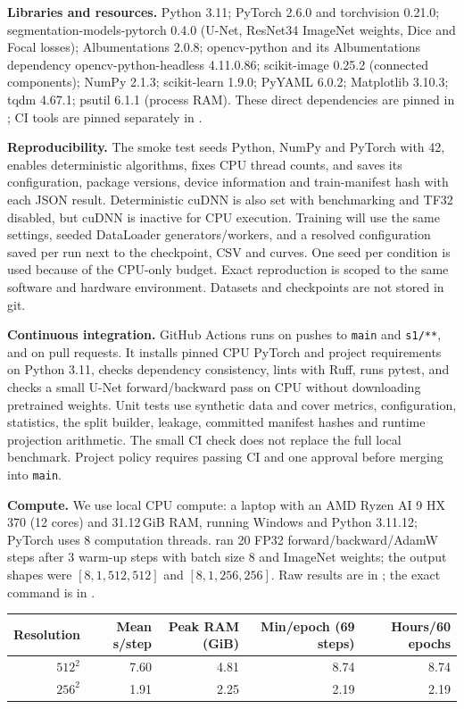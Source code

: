 \documentclass[11pt,a4paper]{article}
\begin{document}
\textbf{Libraries and resources.} Python 3.11; PyTorch 2.6.0 and torchvision 0.21.0; segmentation-models-pytorch 0.4.0 (U-Net, ResNet34 ImageNet weights, Dice and Focal losses); Albumentations 2.0.8; opencv-python and its Albumentations dependency opencv-python-headless 4.11.0.86; scikit-image 0.25.2 (connected components); NumPy 2.1.3; scikit-learn 1.9.0; PyYAML 6.0.2; Matplotlib 3.10.3; tqdm 4.67.1; psutil 6.1.1 (process RAM). These direct dependencies are pinned in ; CI tools are pinned separately in .

\textbf{Reproducibility.} The smoke test seeds Python, NumPy and PyTorch with 42, enables deterministic algorithms, fixes CPU thread counts, and saves its configuration, package versions, device information and train-manifest hash with each JSON result. Deterministic cuDNN is also set with benchmarking and TF32 disabled, but cuDNN is inactive for CPU execution. Training will use the same settings, seeded DataLoader generators/workers, and a resolved configuration saved per run next to the checkpoint, CSV and curves. One seed per condition is used because of the CPU-only budget. Exact reproduction is scoped to the same software and hardware environment. Datasets and checkpoints are not stored in git.

\textbf{Continuous integration.} GitHub Actions runs on pushes to \texttt{main} and \texttt{s1/**}, and on pull requests. It installs pinned CPU PyTorch and project requirements on Python 3.11, checks dependency consistency, lints with Ruff, runs pytest, and checks a small U-Net forward/backward pass on CPU without downloading pretrained weights. Unit tests use synthetic data and cover metrics, configuration, statistics, the split builder, leakage, committed manifest hashes and runtime projection arithmetic. The small CI check does not replace the full local benchmark. Project policy requires passing CI and one approval before merging into \texttt{main}.

\textbf{Compute.} We use local CPU compute: a laptop with an AMD Ryzen AI 9 HX 370 (12 cores) and 31.12\,GiB RAM, running Windows and Python 3.11.12; PyTorch uses 8 computation threads.  ran 20 FP32 forward/backward/AdamW steps after 3 warm-up steps with batch size 8 and ImageNet weights; the output shapes were $[8,1,512,512]$ and $[8,1,256,256]$. Raw results are in ; the exact command is in .

\begin{center}
\small
\begin{tabular}{rrrrr}
\toprule
Resolution & Mean s/step & Peak RAM (GiB) & Min/epoch (69 steps) & Hours/60 epochs \\
\midrule
$512^2$ & 7.60 & 4.81 & 8.74 & 8.74 \\
$256^2$ & 1.91 & 2.25 & 2.19 & 2.19 \\
\bottomrule
\end{tabular}
\end{center}
\end{document}
